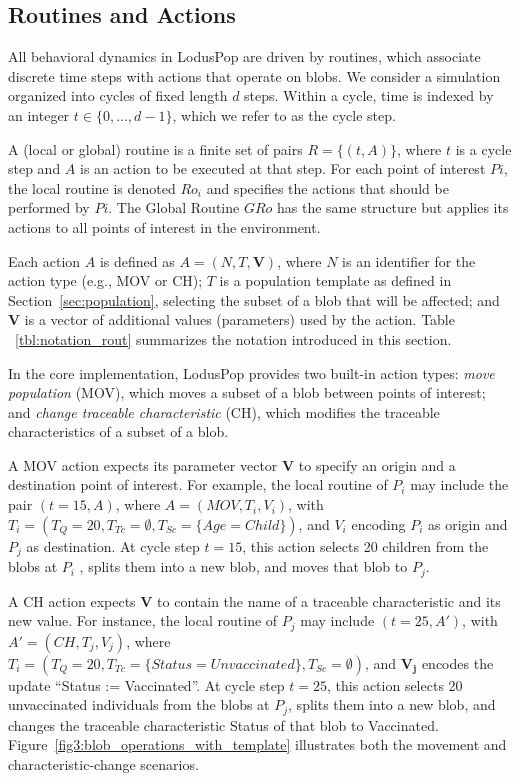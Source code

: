 \documentclass[pdflatex,sn-mathphys-num]{sn-jnl}%
\newcommand\redb[1]{#1}
\theoremstyle{thmstyleone}%
\theoremstyle{thmstyletwo}%
\theoremstyle{thmstylethree}%
\begin{document}
\subsection{Routines and Actions}
\label{sec:routines}

\redb{All behavioral dynamics in LodusPop are driven by routines, which associate discrete time steps with actions that operate on blobs.
We consider a simulation organized into cycles of fixed length 
$d$ steps. Within a cycle, time is indexed by an integer $t \in \{0, ..., d-1\}$, which we refer to as the cycle step. 

A (local or global) routine is a finite set of pairs $R = \{(t, A)\}$, where $t$ is a cycle step and $A$ is an action to be executed at that step.
For each point of interest $Pi$, the local routine is denoted $Ro_i$ and specifies the actions that should be performed by $Pi$.
The Global Routine $GRo$ has the same structure but applies its actions to all points of interest in the environment.

Each action $A$ is defined as $A = (N, T, \bm{V})$, where $N$ is an identifier for the action type (e.g., MOV or CH); $T$ is a population template as defined in Section~\ref{sec:population}, selecting the subset of a blob that will be affected; and $\bm{V}$ is a vector of additional values (parameters) used by the action. 
Table ~\ref{tbl:notation_rout} summarizes the notation introduced in this section.

In the core implementation, LodusPop provides two built-in action types:
\textit{move population} (MOV), which moves a subset of a blob between points of interest; and \textit{change traceable characteristic} (CH), which modifies the traceable characteristics of a subset of a blob.

A MOV action expects its parameter vector $\bm{V}$ to specify an origin and a destination point of interest. For example, the local routine of $P_i$ may include the pair $(t = 15, A)$, where $A = (MOV, T_i, V_i)$, with $T_i=(T_Q=20, T_{Tc}=\emptyset, T_{Sc}=\{Age=Child\})$, and $V_i$ encoding $P_i$ as origin and $P_j$ as destination. At cycle step $t = 15$, this action selects 20 children from the blobs at $P_i$ , splits them into a new blob, and moves that blob to 
$P_j$.

A CH action expects $\bm{V}$ to contain the name of a traceable characteristic and its new value. For instance, the local routine of $P_j$ may include $(t = 25, A')$, with $A' = (CH, T_j, V_j)$, where $T_i=(T_Q=20, T_{Tc}=\{Status=Unvaccinated\}, T_{Sc}=\emptyset)$, and $\bm{V_j}$ encodes the update ``Status := Vaccinated''. At cycle step $t=25$, this action selects 20 unvaccinated individuals from the blobs at $P_j$, splits them into a new blob, and changes the traceable characteristic Status of that blob to Vaccinated. Figure~\ref{fig3:blob_operations_with_template} illustrates both the movement and characteristic-change scenarios.

}
\end{document}
